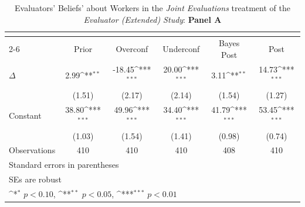 \begin{table}[htbp]\centering
\def\sym#1{\ifmmode^{#1}\else\(^{#1}\)\fi}
\caption{Evaluators' Beliefs' about Workers in the \textit{Joint Evaluations} treatment of the \textit{Evaluator (Extended) Study}: \textbf{Panel A}}
\begin{tabular}{l*{5}{c}}
\hline\hline
                &\multicolumn{5}{c}{}                                                                          \\\cmidrule(lr){2-6}
                &\multicolumn{1}{c}{Prior}&\multicolumn{1}{c}{Overconf}&\multicolumn{1}{c}{Underconf}&\multicolumn{1}{c}{Bayes Post}&\multicolumn{1}{c}{Post}\\
\hline
$\Delta$        &     2.99\sym{**} &   -18.45\sym{***}&    20.00\sym{***}&     3.11\sym{**} &    14.73\sym{***}\\
                &   (1.51)         &   (2.17)         &   (2.14)         &   (1.54)         &   (1.27)         \\
Constant        &    38.80\sym{***}&    49.96\sym{***}&    34.40\sym{***}&    41.79\sym{***}&    53.45\sym{***}\\
                &   (1.03)         &   (1.54)         &   (1.41)         &   (0.98)         &   (0.74)         \\
\hline
Observations    &      410         &      410         &      410         &      408         &      410         \\
\hline\hline
\multicolumn{6}{l}{\footnotesize Standard errors in parentheses}\\
\multicolumn{6}{l}{\footnotesize SEs are robust}\\
\multicolumn{6}{l}{\footnotesize \sym{*} \(p<0.10\), \sym{**} \(p<0.05\), \sym{***} \(p<0.01\)}\\
\end{tabular}
\end{table}
